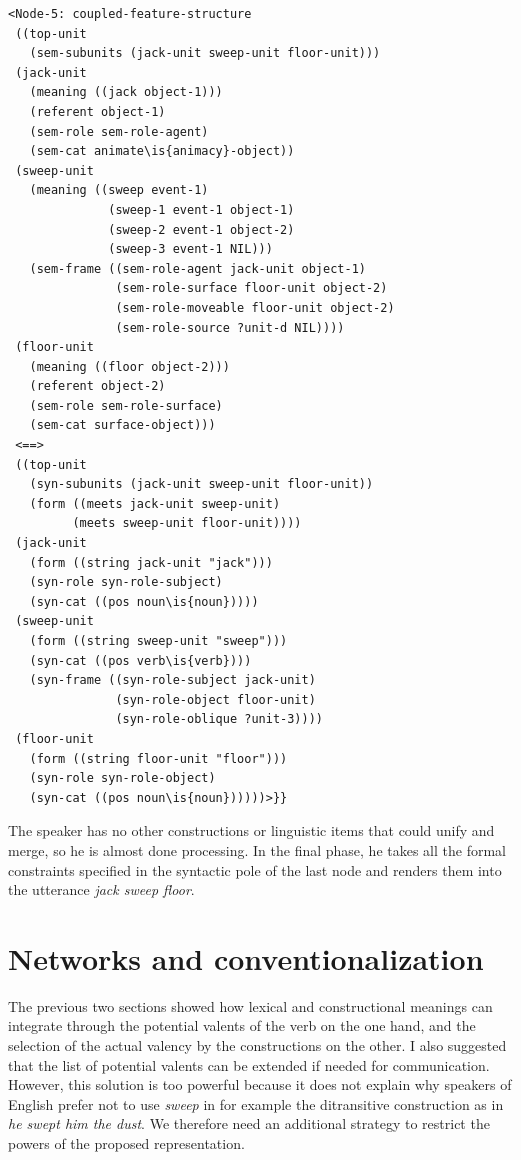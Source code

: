 \ea
\begin{lstlisting}
<Node-5: coupled-feature-structure
 ((top-unit
   (sem-subunits (jack-unit sweep-unit floor-unit)))
 (jack-unit
   (meaning ((jack object-1)))
   (referent object-1)
   (sem-role sem-role-agent)
   (sem-cat animate\is{animacy}-object))
 (sweep-unit
   (meaning ((sweep event-1)
              (sweep-1 event-1 object-1)
              (sweep-2 event-1 object-2)
              (sweep-3 event-1 NIL)))
   (sem-frame ((sem-role-agent jack-unit object-1)
               (sem-role-surface floor-unit object-2)
               (sem-role-moveable floor-unit object-2)
               (sem-role-source ?unit-d NIL))))
 (floor-unit
   (meaning ((floor object-2)))
   (referent object-2)
   (sem-role sem-role-surface)
   (sem-cat surface-object)))
 <==>
 ((top-unit
   (syn-subunits (jack-unit sweep-unit floor-unit))
   (form ((meets jack-unit sweep-unit) 
         (meets sweep-unit floor-unit))))
 (jack-unit
   (form ((string jack-unit "jack")))
   (syn-role syn-role-subject)
   (syn-cat ((pos noun\is{noun}))))
 (sweep-unit
   (form ((string sweep-unit "sweep")))
   (syn-cat ((pos verb\is{verb})))
   (syn-frame ((syn-role-subject jack-unit)
               (syn-role-object floor-unit)
               (syn-role-oblique ?unit-3))))
 (floor-unit
   (form ((string floor-unit "floor")))
   (syn-role syn-role-object)
   (syn-cat ((pos noun\is{noun})))))>}}

\end{lstlisting}
\z

The speaker has no other constructions or linguistic items that could unify and merge, so he is almost done processing. In the final phase, he takes all the formal constraints specified in the syntactic pole of the last node and renders them into the utterance {\em jack sweep floor}.

\section{Networks and conventionalization}

The previous two sections showed how lexical and constructional meanings can integrate through the potential valents of the verb on the one hand, and the selection of the actual valency by the constructions on the other. I also suggested that the list of potential valents can be extended if needed for communication. However, this solution is too powerful because it does not explain why speakers of English prefer not to use {\em sweep} in for example the ditransitive construction as in {\em *he swept him the dust}. We therefore need an additional strategy to restrict the powers of the proposed representation.

